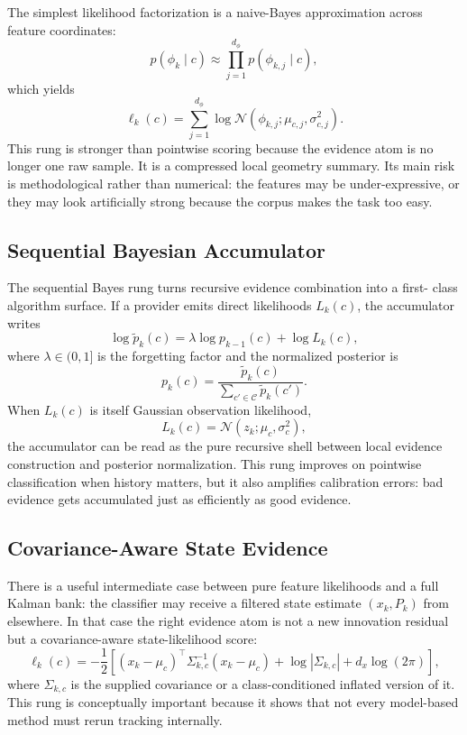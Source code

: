 \documentclass[11pt]{article}
\begin{document}
The simplest likelihood factorization is a naive-Bayes approximation across
feature coordinates:
\begin{equation}
p(\phi_k \mid c) \approx \prod_{j=1}^{d_\phi} p(\phi_{k,j} \mid c),
\end{equation}
which yields
\begin{equation}
\ell_k(c)
=
\sum_{j=1}^{d_\phi}
\log \mathcal{N}(\phi_{k,j}; \mu_{c,j}, \sigma_{c,j}^2).
\end{equation}
This rung is stronger than pointwise scoring because the evidence atom is no
longer one raw sample. It is a compressed local geometry summary. Its main risk
is methodological rather than numerical: the features may be under-expressive,
or they may look artificially strong because the corpus makes the task too
easy.

\subsection{Sequential Bayesian Accumulator}
The sequential Bayes rung turns recursive evidence combination into a first-
class algorithm surface. If a provider emits direct likelihoods \(L_k(c)\), the
accumulator writes
\begin{equation}
\log \tilde{p}_k(c)
=
\lambda \log p_{k-1}(c) + \log L_k(c),
\end{equation}
where \(\lambda \in (0,1]\) is the forgetting factor and the normalized
posterior is
\begin{equation}
p_k(c)
=
\frac{\tilde{p}_k(c)}{\sum_{c' \in \mathcal{C}} \tilde{p}_k(c')}.
\end{equation}
When \(L_k(c)\) is itself Gaussian observation likelihood,
\begin{equation}
L_k(c) = \mathcal{N}(z_k; \mu_c, \sigma_c^2),
\end{equation}
the accumulator can be read as the pure recursive shell between local evidence
construction and posterior normalization. This rung improves on pointwise
classification when history matters, but it also amplifies calibration errors:
bad evidence gets accumulated just as efficiently as good evidence.

\subsection{Covariance-Aware State Evidence}
There is a useful intermediate case between pure feature likelihoods and a full
Kalman bank: the classifier may receive a filtered state estimate
\((x_k, P_k)\) from elsewhere. In that case the right evidence atom is not a
new innovation residual but a covariance-aware state-likelihood score:
\begin{equation}
\ell_k(c)
=
-\frac{1}{2}
\left[
(x_k-\mu_c)^\top \Sigma_{k,c}^{-1}(x_k-\mu_c)
+
\log |\Sigma_{k,c}|
+
d_x \log(2\pi)
\right],
\end{equation}
where \(\Sigma_{k,c}\) is the supplied covariance or a class-conditioned
inflated version of it. This rung is conceptually important because it shows
that not every model-based method must rerun tracking internally.
\end{document}
